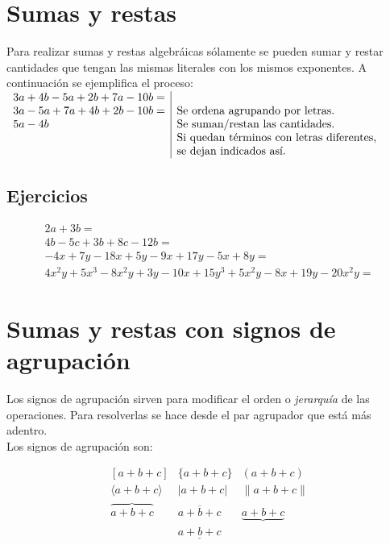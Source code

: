 \section{Sumas y restas}
Para realizar sumas y restas algebráicas sólamente se pueden sumar y restar cantidades que tengan las mismas literales con los mismos exponentes. A continuación se ejemplifica el proceso:\\

$
\begin{array}{l|{l}}
3a+4b-5a+2b+7a-10b= & \\
3a-5a+7a+4b+2b-10b= &  \text{Se ordena agrupando por letras.}\\
5a-4b & \text{Se suman/restan las cantidades.}\\
 & \text{Si quedan términos con letras diferentes,}\\
 & \text{se dejan indicados así.}
\end{array}
$\\

\subsection{Ejercicios}
$$
\begin{array}{l}
2a+3b =\\
4b-5c+3b+8c-12b=\\
-4x+7y-18x+5y-9x+17y-5x+8y=\\
4x^2y+5x^3-8x^2y+3y-10x+15y^3+5x^2y-8x+19y-20x^2y=
\end{array}
$$
\section{Sumas y restas con signos de agrupación}
Los signos de agrupación sirven para modificar el orden o \emph{jerarquía} de las operaciones. Para resolverlas se hace desde el par agrupador que está más adentro.\\
Los signos de agrupación son:\\
\begin{center}
$$
\begin{array}{ccc}
[a+b+c] & \{a+b+c\} & (a+b+c)\\
\langle a+b+c \rangle & |a+b+c| & \|a+b+c\|\\
\overbrace{a+b+c} & \overline{a+b+c} & \underbrace{a+b+c}\\
 & \underline{a+b+c} & \\
\end{array}
$$
\end{center}

